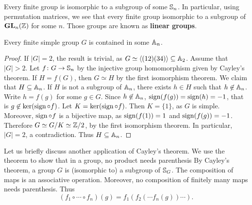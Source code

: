Every finite group is isomorphic to a subgroup of some 
$\mathbb{S}_n$. 
In particular, using permutation matrices, 
we see that every finite group 
isomorphic to a subgroup of $\mathbf{GL}_n(\mathbb{Z})$ for some $n$.
Those groups are known as \textbf{linear groups}.

\begin{proposition}
Every finite simple group $G$ is contained in some $\mathbb{A}_n$.
\end{proposition}

\begin{proof}
If $|G|=2$, the result is trivial, as $G\simeq\langle (12)(34)\rangle\subseteq\mathbb{A}_2$. Assume 
that $|G|>2$.
Let $f\colon G\to\mathbb{S}_n$ by the injective group homomorphism
given by Cayley's theorem. If $H=f(G)$, then 
$G\simeq H$ by the first isomorphism theorem. 
We claim that $H\subseteq\mathbb{A}_n$. If
$H$ is not a subgroup of $\mathbb{A}_n$, there exists $h\in H$ such that  $h\not\in\mathbb{A}_n$. Write $h=f(g)$ for some 
$g\in G$. Since $h\not\in\mathbb{A}_n$,
$\operatorname{sign}(f(g))=\operatorname{sign}(h)=-1$, that is 
$g\not\in\ker(\operatorname{sign}\circ f)$.
Let $K=\ker(\operatorname{sign}\circ f)$. Then $K=\{1\}$, as $G$ is simple. Moreover, $\operatorname{sign}\circ f$ is a bijective map, as
$\operatorname{sign}(f(1))=1$ and $\operatorname{sign}(f(g))=-1$. Therefore 
$G\simeq G/K\simeq\mathbb{Z}/2$, by the first isomorphism theorem.  
In particular, $|G|=2$, a contradiction. Thus $H\subseteq\mathbb{A}_n$.
\end{proof}

Let us briefly discuss another application of Cayley's theorem. 
We use the theorem to show that in a group, 
no product needs parenthesis 
By Cayley's theorem, a group $G$ is (isomorphic to) a 
subgroup of $\mathbb{S}_G$. The composition of maps is an associative operation. Moreover, no composition of finitely many maps 
needs parenthesis. Thus 
\[
(f_1\circ\cdots\circ f_n)(g)=f_1(f_2(\cdots f_n(g))\cdots).
\]
